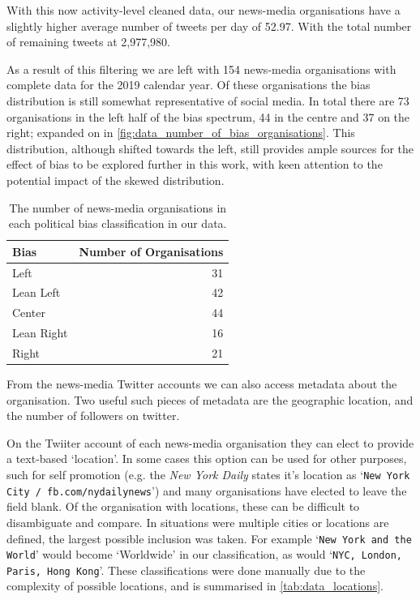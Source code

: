 With this now activity-level cleaned data, our news-media organisations have a slightly higher average number of tweets per day of 52.97. With the total number of remaining tweets at 2,977,980.


As a result of this filtering we are left with 154 news-media organisations with complete data for the 2019 calendar year. Of these organisations the bias distribution is still somewhat representative of social media.  In total there are 73 organisations in the left half of the bias spectrum, 44 in the centre and 37 on the right; expanded on in \autoref{fig:data_number_of_bias_organisations}. This distribution, although shifted towards the left, still provides ample sources for the effect of bias to be explored further in this work, with keen attention to the potential impact of the skewed distribution. 

\begin{table}[h]
	\centering
	\begin{tabular}{lr}
		\toprule
		Bias &   Number of Organisations \\
		\midrule
		{\color{Left} Left }&  31 \\
		{\color{LeanLeft} Lean Left }&  42 \\
		{\color{Center} Center }&  44 \\
		{\color{LeanRight} Lean Right }&  16 \\
		{\color{Right} Right }&  21 \\
		\bottomrule
	\end{tabular}
	\caption{The number of news-media organisations in each political bias classification in our data.}
	\label{fig:data_number_of_bias_organisations}
\end{table}


From the news-media Twitter accounts we can also access metadata about the organisation. Two useful such pieces of metadata are the geographic location, and the number of followers on twitter.

On the Twiiter account of each news-media organisation they can elect to provide a text-based `location'. In some cases this option can be used for other purposes, such for self promotion (e.g. the \emph{New York Daily} states it's location as `\texttt{New York City  /  fb.com/nydailynews}') and many organisations have elected to leave the field blank. 
Of the organisation with locations, these can be difficult to disambiguate and compare. In situations were multiple cities or locations are defined, the largest possible inclusion was taken. For example `\texttt{New York and the World}' would become `Worldwide' in our classification, as would `\texttt{NYC, London, Paris, Hong Kong}'. These classifications were done manually due to the complexity of possible locations, and is summarised in  \autoref{tab:data_locations}.

